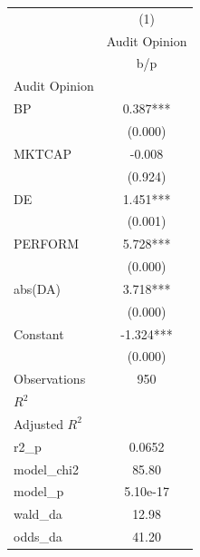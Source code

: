 {
\def\sym#1{\ifmmode^{#1}\else\(^{#1}\)\fi}
\begin{tabular}{l*{1}{c}}
\hline\hline
                    &\multicolumn{1}{c}{(1)}\\
                    &\multicolumn{1}{c}{Audit Opinion}\\
                    &         b/p   \\
\hline
Audit Opinion       &               \\
BP                  &       0.387***\\
                    &     (0.000)   \\
MKTCAP              &      -0.008   \\
                    &     (0.924)   \\
DE                  &       1.451***\\
                    &     (0.001)   \\
PERFORM             &       5.728***\\
                    &     (0.000)   \\
abs(DA)             &       3.718***\\
                    &     (0.000)   \\
Constant            &      -1.324***\\
                    &     (0.000)   \\
\hline
Observations        &         950   \\
\(R^{2}\)           &               \\
Adjusted \(R^{2}\)  &               \\
r2\_p                &      0.0652   \\
model\_chi2          &       85.80   \\
model\_p             &    5.10e-17   \\
wald\_da             &       12.98   \\
odds\_da             &       41.20   \\
\hline\hline
\end{tabular}
}
